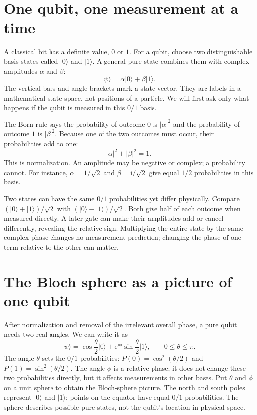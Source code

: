 \documentclass[11pt,oneside]{book}
\newcommand{\ii}{\mathrm{i}}
\newcommand{\ee}{\mathrm{e}}
\newcommand{\ket}[1]{\lvert #1\rangle}
\theoremstyle{reviewstyle}
\begin{document}
\section{One qubit, one measurement at a time}
A classical bit has a definite value, $0$ or $1$. For a qubit, choose two distinguishable basis states called $\ket0$ and $\ket1$. A general pure state combines them with complex amplitudes $\alpha$ and $\beta$:
\begin{equation}
\ket\psi=\alpha\ket0+\beta\ket1.
\end{equation}
The vertical bars and angle brackets mark a state vector. They are labels in a mathematical state space, not positions of a particle. We will first ask only what happens if the qubit is measured in this $0/1$ basis.

The Born rule says the probability of outcome $0$ is $|\alpha|^2$ and the probability of outcome $1$ is $|\beta|^2$. Because one of the two outcomes must occur, their probabilities add to one:
\begin{equation}
|\alpha|^2+|\beta|^2=1.
\end{equation}
This is normalization. An amplitude may be negative or complex; a probability cannot. For instance, $\alpha=1/\sqrt2$ and $\beta=\ii/\sqrt2$ give equal $1/2$ probabilities in this basis.

Two states can have the same $0/1$ probabilities yet differ physically. Compare $(\ket0+\ket1)/\sqrt2$ with $(\ket0-\ket1)/\sqrt2$. Both give half of each outcome when measured directly. A later gate can make their amplitudes add or cancel differently, revealing the relative sign. Multiplying the entire state by the same complex phase changes no measurement prediction; changing the phase of one term relative to the other can matter.

\section{The Bloch sphere as a picture of one qubit}
After normalization and removal of the irrelevant overall phase, a pure qubit needs two real angles. We can write it as
\begin{equation}
\ket\psi=\cos\frac\theta2\ket0
+\ee^{\ii\phi}\sin\frac\theta2\ket1,
\qquad 0\leq\theta\leq\pi.
\end{equation}
The angle $\theta$ sets the $0/1$ probabilities: $P(0)=\cos^2(\theta/2)$ and $P(1)=\sin^2(\theta/2)$. The angle $\phi$ is a relative phase; it does not change these two probabilities directly, but it affects measurements in other bases. Put $\theta$ and $\phi$ on a unit sphere to obtain the Bloch-sphere picture. The north and south poles represent $\ket0$ and $\ket1$; points on the equator have equal $0/1$ probabilities. The sphere describes possible pure states, not the qubit's location in physical space.
\end{document}
